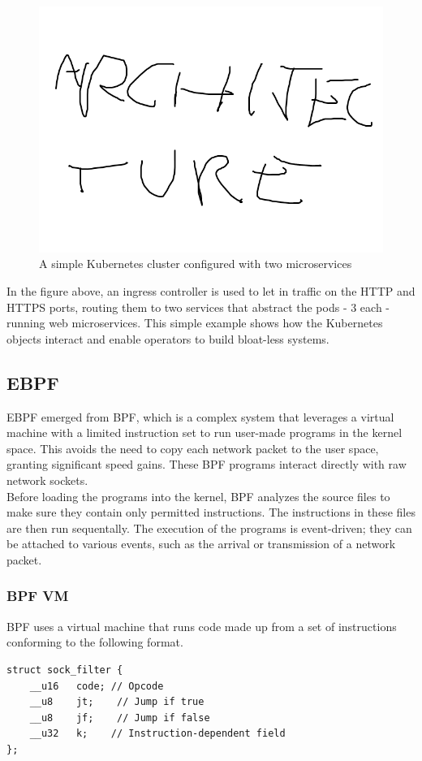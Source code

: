 \begin{figure}[H]
	\centering
	\includegraphics[width=\textwidth]{images/archi.png}
	\caption{A simple Kubernetes cluster configured with two microservices}
	\label{fig:kube-cluster}
\end{figure}

In the figure above, an ingress controller is used to let in traffic on the HTTP and HTTPS ports, routing them to two services that abstract the pods - 3 each - running web microservices. This simple example shows how the Kubernetes objects interact and enable operators to build bloat-less systems.

\newpage
\subsection{EBPF}
EBPF\cite{ebpf} emerged from BPF\cite{bpf-original}, which is a complex system that leverages a virtual machine with a limited instruction set to run user-made programs in the kernel space. This avoids the need to copy each network packet to the user space, granting significant speed gains. These BPF programs interact directly with raw network sockets. \\

Before loading the programs into the kernel, BPF analyzes the source files to make sure they contain only permitted instructions. The instructions in these files are then run sequentally. The execution of the programs is event-driven; they can be attached to various events, such as the arrival or transmission of a network packet.
 
\subsubsection{BPF VM}
BPF uses a virtual machine that runs code made up from a set of instructions conforming to the following format.
\begin{verbatim}
struct sock_filter {
	__u16	code; // Opcode
	__u8	jt;	   // Jump if true
	__u8	jf;    // Jump if false
	__u32	k;    // Instruction-dependent field
};
\end{verbatim}

